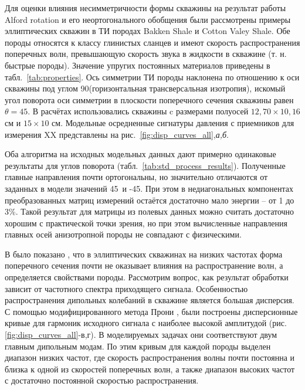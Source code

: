 \documentclass[a4paper,11pt]{article}
\begin{document}
Для оценки влияния несимметричности формы скважины на результат работы Alford rotation и его неортогонального обобщения были рассмотрены примеры эллиптических скважин в ТИ породах  Bakken Shale и Cotton Valey Shale. Обе породы относятся к классу глинистых сланцев и имеют скорость распространения поперечных волн, превышающую скорость звука в жидкости в скважине (т. н. быстрые породы). Значение упругих постоянных материалов приведены в табл.~\ref{tab:properties}. Ось симметрии ТИ породы наклонена по отношению к оси скважины под углом 90\textdegree (горизонтальная трансверсальная изотропия), искомый угол поворота оси симметрии в плоскости поперечного сечения скважины равен $\theta = 45$\textdegree. В расчётах использовались скважины c размерами полуосей $12,70 \times 10,16$ см и $15 \times 10$ см. Модельные осредненные сигнатуры давления с приемников для измерения XX представлены на рис.~\ref{fig:disp_curves_all},\textit{а,б}.

Оба алгоритма на исходных модельных данных дают примерно одинаковые результаты для углов поворота (табл.~\ref{tab:std_process_results}). Полученные главные направления почти ортогональны, но значительно отличаются от заданных в модели значений 45\textdegree \ и -45\textdegree. При этом в недиагональных компонентах преобразованных матриц измерений остаётся достаточно мало энергии -- от 1 до 3\%. Такой результат для матрицы из полевых данных можно считать достаточно хорошим с практической точки зрения, но при этом вычисленные направления главных осей анизотропной породы не совпадают с физическими.

В \cite{Seroices2010} было показано , что в эллиптических скважинах на низких частотах форма поперечного сечения почти не оказывает влияния на распространение волн, а определяется свойствами породы. Рассмотрим вопрос, как результат обработки зависит от частотного спектра приходящего сигнала. Особенностью распространения дипольных колебаний в скважине является большая дисперсия. С помощью модифицированного метода Прони \cite{Ekstrom1995}, были построены дисперсионные кривые для гармоник исходного сигнала с наиболее высокой амплитудой (рис. \ref{fig:disp_curves_all}-в,г). В моделируемых задачах они соответствуют двум главным дипольным модам. %
По этим кривым для каждой породы выделен диапазон низких частот, где скорость распространения волны почти постоянна и близка к одной из скоростей поперечных волн, а также диапазон высоких частот с достаточно постоянной скоростью распространения. 
\end{document}
